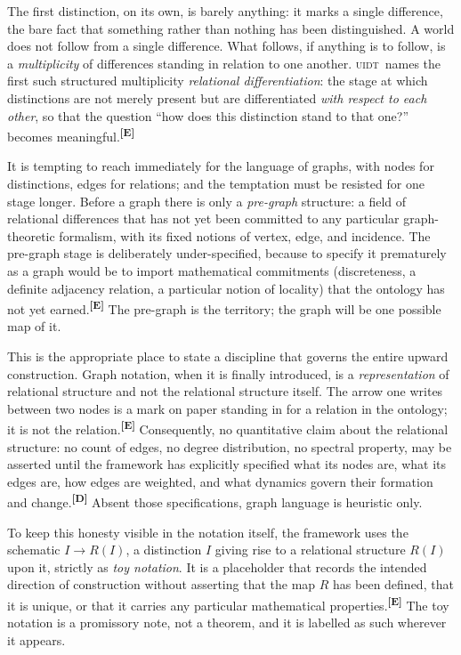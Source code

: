 \documentclass[12pt,a4paper,twoside]{article}
\theoremstyle{plain}
\theoremstyle{definition}
\theoremstyle{remark}
\newcommand{\UIDT}{\textsc{uidt}}
\newcommand{\catmark}[1]{\textsuperscript{\textsf{\textbf{[#1]}}}}
\begin{document}
The first distinction, on its own, is barely anything: it marks a single difference, the bare fact that something rather than nothing has been distinguished. A world does not follow from a single difference. What follows, if anything is to follow, is a \emph{multiplicity} of differences standing in relation to one another. \UIDT\ names the first such structured multiplicity \emph{relational differentiation}: the stage at which distinctions are not merely present but are differentiated \emph{with respect to each other}, so that the question ``how does this distinction stand to that one?'' becomes meaningful.\catmark{E}

It is tempting to reach immediately for the language of graphs, with nodes for distinctions, edges for relations; and the temptation must be resisted for one stage longer. Before a graph there is only a \emph{pre-graph} structure: a field of relational differences that has not yet been committed to any particular graph-theoretic formalism, with its fixed notions of vertex, edge, and incidence. The pre-graph stage is deliberately under-specified, because to specify it prematurely as a graph would be to import mathematical commitments (discreteness, a definite adjacency relation, a particular notion of locality) that the ontology has not yet earned.\catmark{E} The pre-graph is the territory; the graph will be one possible map of it.

This is the appropriate place to state a discipline that governs the entire upward construction. Graph notation, when it is finally introduced, is a \emph{representation} of relational structure and not the relational structure itself. The arrow one writes between two nodes is a mark on paper standing in for a relation in the ontology; it is not the relation.\catmark{E} Consequently, no quantitative claim about the relational structure: no count of edges, no degree distribution, no spectral property, may be asserted until the framework has explicitly specified what its nodes are, what its edges are, how edges are weighted, and what dynamics govern their formation and change.\catmark{D} Absent those specifications, graph language is heuristic only.

To keep this honesty visible in the notation itself, the framework uses the schematic $I \to R(I)$, a distinction $I$ giving rise to a relational structure $R(I)$ upon it, strictly as \emph{toy notation}. It is a placeholder that records the intended direction of construction without asserting that the map $R$ has been defined, that it is unique, or that it carries any particular mathematical properties.\catmark{E} The toy notation is a promissory note, not a theorem, and it is labelled as such wherever it appears.
\end{document}
